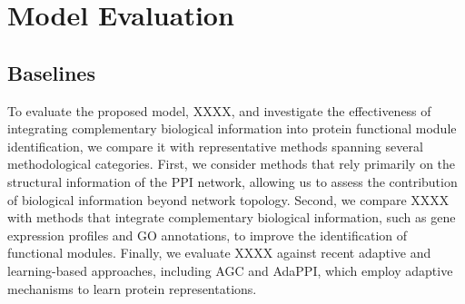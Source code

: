 \section{Model Evaluation}
\subsection{Baselines}
To evaluate the proposed model, XXXX, and investigate the effectiveness of integrating complementary biological information into protein functional module identification, we compare it with representative methods spanning several methodological categories. First, we consider methods that rely primarily on the structural information of the PPI network, allowing us to assess the contribution of biological information beyond network topology. Second, we compare XXXX with methods that integrate complementary biological information, such as gene expression profiles and GO annotations, to improve the identification of functional modules. Finally, we evaluate XXXX against recent adaptive and learning-based approaches, including AGC and AdaPPI, which employ adaptive mechanisms to learn protein representations.

